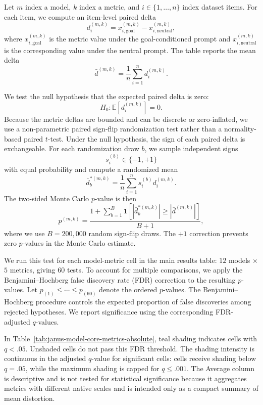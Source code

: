 \documentclass[11pt]{article}
\begin{document}
Let \(m\) index a model, \(k\) index a metric, and \(i \in \{1,\ldots,n\}\)
index dataset items. For each item, we compute an item-level paired delta
\[
d_{i}^{(m,k)} =
x_{i,\mathrm{goal}}^{(m,k)} - x_{i,\mathrm{neutral}}^{(m,k)},
\]
where \(x_{i,\mathrm{goal}}^{(m,k)}\) is the metric value under the
goal-conditioned prompt and \(x_{i,\mathrm{neutral}}^{(m,k)}\) is the
corresponding value under the neutral prompt. The table reports the mean delta
\[
\bar d^{(m,k)} = \frac{1}{n}\sum_{i=1}^{n} d_i^{(m,k)}.
\]

We test the null hypothesis that the expected paired delta is zero:
\[
H_0: \mathbb{E}[d_i^{(m,k)}] = 0.
\]
Because the metric deltas are bounded and can be discrete or zero-inflated, we
use a non-parametric paired sign-flip randomization test \citep{yeh2000more} rather than a
normality-based paired \(t\)-test. Under the null hypothesis, the sign of each
paired delta is exchangeable. For each randomization draw \(b\), we sample
independent signs
\[
s_i^{(b)} \in \{-1,+1\}
\]
with equal probability and compute a randomized mean
\[
\bar d_b^{*(m,k)} =
\frac{1}{n}\sum_{i=1}^{n} s_i^{(b)} d_i^{(m,k)}.
\]
The two-sided Monte Carlo \(p\)-value is then
\[
p^{(m,k)} =
\frac{
1 + \sum_{b=1}^{B}
\mathbf{1}\!\left[
\left|\bar d_b^{*(m,k)}\right|
\geq
\left|\bar d^{(m,k)}\right|
\right]
}{
B+1
},
\]
where we use \(B=200{,}000\) random sign-flip draws. The \(+1\) correction
prevents zero \(p\)-values in the Monte Carlo estimate.

We run this test for each model-metric cell in the main results table:
\(12\) models \(\times\) \(5\) metrics, giving \(60\) tests. To account for
multiple comparisons, we apply the Benjamini--Hochberg false discovery rate
(FDR) correction \citep{benjamini1995controlling} to the resulting \(p\)-values. Let
\(p_{(1)} \leq \cdots \leq p_{(60)}\) denote the ordered \(p\)-values. The
Benjamini--Hochberg procedure controls the expected proportion of false
discoveries among rejected hypotheses. We report significance using the
corresponding FDR-adjusted \(q\)-values.

In Table~\ref{tab:janus-model-core-metrics-absolute}, teal shading indicates
cells with \(q<.05\). Unshaded cells do not pass this FDR threshold. The
shading intensity is continuous in the adjusted \(q\)-value for significant
cells: cells receive shading below \(q=.05\), while the maximum
shading is capped for \(q \leq .001\). The Average column is descriptive and is not tested for statistical significance because it aggregates metrics with different native scales and is intended only as a compact summary of mean distortion.
\end{document}
